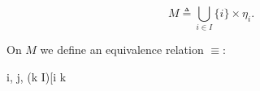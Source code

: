 $$M \triangleq \bigcup_{i \in I} \{i\} \times \eta_i.$$

On $M$ we define an equivalence relation $\equiv$:

$$\langle i, \alpha \rangle \triangleq \langle j, \beta \rangle \quad {} \quad (\exists k \in I)[i \leq k \
